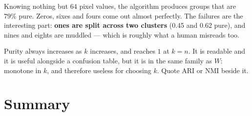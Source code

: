 \documentclass[11pt]{article}
\begin{document}
Knowing nothing but $64$ pixel values, the algorithm produces groups that are
$79\%$ pure. Zeros, sixes and fours come out almost perfectly. The failures
are the interesting part: \textbf{ones are split across two clusters} (0.45
and 0.62 pure), and nines and eights are muddled --- which is roughly what a
human misreads too.

\begin{caution}
Purity always increases as $k$ increases, and reaches $1$ at $k = n$. It is
readable and it is useful alongside a confusion table, but it is in the same
family as $W$: monotone in $k$, and therefore useless for choosing $k$. Quote
ARI or NMI beside it.
\end{caution}

\notesources{\AMLUnitVIISources}

\section{Summary}
\label{sec:summary}
\end{document}
